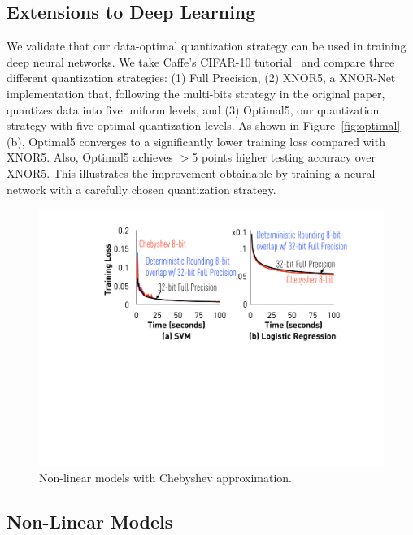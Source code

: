 \documentclass{article}
\begin{document}
\vspace{-1em}
\subsection{Extensions to Deep Learning}
\vspace{-0.5em}

We validate that our data-optimal quantization
strategy can be used in training deep neural
networks. We take Caffe's CIFAR-10 tutorial~\cite{Caffe:CIFAR10}
and compare three different quantization
strategies: (1) Full Precision, (2) XNOR5, 
a XNOR-Net implementation that, following
the multi-bits strategy in
the original paper, quantizes data into
five uniform levels, and (3)
Optimal5, our quantization strategy with
five optimal quantization levels. As
shown in Figure~\ref{fig:optimal}(b), Optimal5
converges to a significantly lower training 
loss compared with XNOR5. Also,
Optimal5 achieves $>$5 points higher testing accuracy over XNOR5.
This illustrates the improvement
obtainable by training a neural network with
a carefully chosen quantization strategy.



\begin{figure}[t]
\centering
\includegraphics[width=0.68\columnwidth]{final-experiments/chebyshev} 
\vspace{-1.2em}
\caption{Non-linear models with Chebyshev approximation.}
\vspace{-1.9em}
\label{fig:chebyshev}
\end{figure}

\vspace{-1em}
\subsection{Non-Linear Models}
\vspace{-0.5em}
\end{document}
